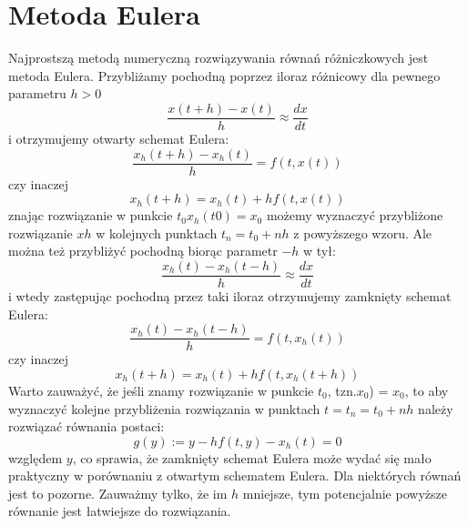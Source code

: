\documentclass[12pt,a4paper]{report}
\begin{document}
\chapter{Metoda Eulera}
Najprostszą metodą numeryczną rozwiązywania równań różniczkowych jest metoda Eulera. Przybliżamy pochodną poprzez iloraz różnicowy dla pewnego
parametru $h > 0$ 
\begin{equation*}
\frac{x(t+h) - x(t)}{h} \approx \frac{dx}{dt}
\end{equation*}
\newline
i otrzymujemy otwarty schemat Eulera:
\begin{equation*}
\frac{x_h(t+h)-x_h(t)}{h} = f(t,x(t))
\end{equation*}
\newline 
czy inaczej 
\begin{equation*}
x_h(t+h) = x_h(t) + hf(t,x(t))
\end{equation*}
\newline
znając rozwiązanie w punkcie $t_0 x_h(t0) = x_0$ możemy wyznaczyć przybliżone rozwiązanie
$xh$ w kolejnych punktach $t_n = t_0 + nh$ z powyższego wzoru. Ale można też przybliżyć
pochodną biorąc parametr $-h$ w tył:
\begin{equation*}
\frac{x_h(t)-x_h(t-h)}{h} \approx \frac{dx}{dt}
\end{equation*}
\newline
i wtedy zastępując pochodną przez taki iloraz otrzymujemy zamknięty schemat Eulera:
\begin{equation*}
\frac{x_h(t)-x_h(t-h)}{h} = f(t,x_h(t))
\end{equation*}
\newline
czy inaczej 
\begin{equation*}
x_h(t+h) = x_h(t) + hf(t,x_h(t+h))
\end{equation*}
\newline
Warto zauważyć, że jeśli znamy rozwiązanie w punkcie $t_0$, tzn.$ x_0$) = $x_0$, to aby wyznaczyć kolejne przybliżenia rozwiązania w punktach $t = t_n = t_0+nh$ należy rozwiązać równania postaci:
\begin{equation*}
g(y):= y -hf(t, y) - x_h(t) = 0
\end{equation*}
\newline
względem $y$, co sprawia, że zamknięty schemat Eulera może wydać się mało praktyczny w porównaniu z otwartym schematem Eulera. Dla niektórych równań jest to pozorne. Zauważmy tylko, że im $h$ mniejsze, tym potencjalnie powyższe równanie jest łatwiejsze do rozwiązania. 
\end{document}
